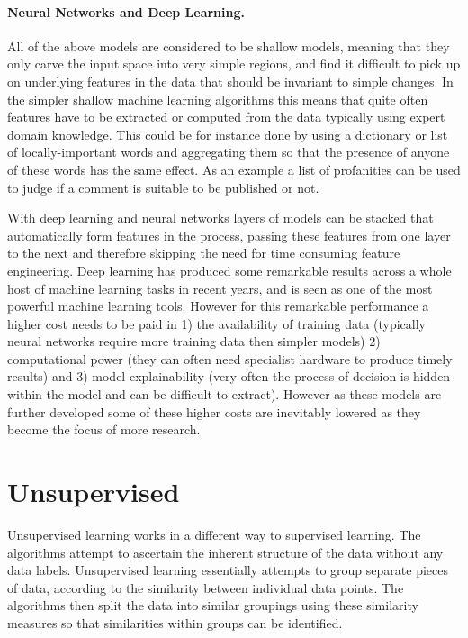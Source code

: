 \paragraph{Neural Networks and Deep Learning.} All of the above models are considered to be shallow models, meaning that they only carve the input space into very simple regions, and find it difficult to pick up on underlying features in the data that should be invariant to simple changes. In the simpler shallow machine learning algorithms this means that quite often features have to be extracted or computed from the data typically using expert domain knowledge. This could be for instance done by using a dictionary or list of locally-important words and aggregating them so that the presence of anyone of these words has the same effect. As an example a list of profanities can be used to judge if a comment is suitable to be published or not. 

With deep learning and neural networks layers of models can be stacked that automatically form features in the process, passing these features from one layer to the next and therefore skipping the need for time consuming feature engineering.  Deep learning has produced some remarkable results across a whole host of machine learning tasks in recent years, and is seen as one of the most powerful machine learning tools. However for this remarkable performance a higher cost needs to be paid in 1) the availability of training data (typically neural networks require more training data then simpler models) 2) computational power (they can often need specialist hardware to produce timely results) and 3) model explainability (very often the process of decision is hidden within the model and can be difficult to extract). However as these models are further developed some of these higher costs are inevitably lowered as they become the focus of more research. 


\section{Unsupervised} Unsupervised learning works in a different way to supervised learning. The algorithms attempt to ascertain the inherent structure of the data without any data labels. Unsupervised learning essentially attempts to group separate pieces of data, according to the similarity between individual data points.  The algorithms then split the data into similar groupings using these similarity measures so that similarities within groups can be identified. 


